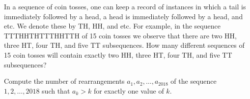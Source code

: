 \documentclass{article}
\begin{document}
     \begin{prob}[AIME 1986/13]{9}
In a sequence of coin tosses, one can keep a record of instances in which a tail is immediately followed by a head, a head is immediately followed by a head, and etc. We denote these by TH, HH, and etc. For example, in the sequence TTTHHTHTTTHHTTH of 15 coin tosses we observe that there are two HH, three HT, four TH, and five TT subsequences. How many different sequences of 15 coin tosses will contain exactly two HH, three HT, four TH, and five TT subsequences?
\end{prob}
    
     \begin{prob}[CMIMC 2018]{13}
Compute the number of rearrangements $a_1,a_2,\ldots,a_{2018}$ of the sequence $1,2,\ldots,2018$ such that $a_k>k$ for exactly one value of $k.$
\end{prob}
\end{document}
